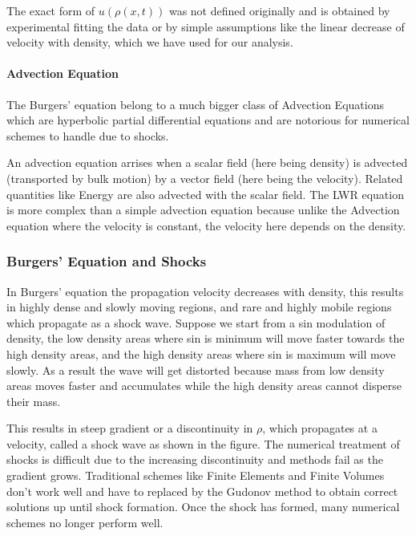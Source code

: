\documentclass[11pt]{article}
\begin{document}
The exact form of \(u(\rho(x,t))\) was not defined originally and is
obtained by experimental fitting the data or by simple assumptions like
the linear decrease of velocity with density, which we have used for our
analysis.

\paragraph{Advection Equation}\label{advection-equation}

The Burgers' equation belong to a much bigger class of Advection
Equations which are hyperbolic partial differential equations and are
notorious for numerical schemes to handle due to shocks.

An advection equation arrises when a scalar field (here being density)
is advected (transported by bulk motion) by a vector field (here being
the velocity). Related quantities like Energy are also advected with the
scalar field. The LWR equation is more complex than a simple advection
equation because unlike the Advection equation where the velocity is
constant, the velocity here depends on the density.

\subsubsection{Burgers' Equation and
Shocks}\label{burgers-equation-and-shocks}

In Burgers' equation the propagation velocity decreases with density,
this results in highly dense and slowly moving regions, and rare and
highly mobile regions which propagate as a shock wave. Suppose we start
from a sin modulation of density, the low density areas where sin is
minimum will move faster towards the high density areas, and the high
density areas where sin is maximum will move slowly. As a result the
wave will get distorted because mass from low density areas moves faster
and accumulates while the high density areas cannot disperse their mass.

This results in steep gradient or a discontinuity in \(\rho\), which
propagates at a velocity, called a shock wave as shown in the figure.
The numerical treatment of shocks is difficult due to the increasing
discontinuity and methods fail as the gradient grows. Traditional
schemes like Finite Elements and Finite Volumes don't work well and have
to replaced by the Gudonov method to obtain correct solutions up until
shock formation. Once the shock has formed, many numerical schemes no
longer perform well.
\end{document}
